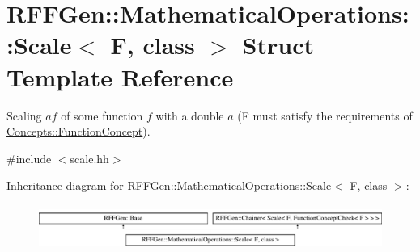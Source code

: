 \hypertarget{structRFFGen_1_1MathematicalOperations_1_1Scale}{\section{R\-F\-F\-Gen\-:\-:Mathematical\-Operations\-:\-:Scale$<$ F, class $>$ Struct Template Reference}
\label{structRFFGen_1_1MathematicalOperations_1_1Scale}
}


Scaling $ af $ of some function $ f $ with a double $ a $ (F must satisfy the requirements of \hyperlink{structRFFGen_1_1Concepts_1_1FunctionConcept}{Concepts\-::\-Function\-Concept}).  




{\ttfamily \#include $<$scale.\-hh$>$}

Inheritance diagram for R\-F\-F\-Gen\-:\-:Mathematical\-Operations\-:\-:Scale$<$ F, class $>$\-:\begin{figure}[H]
\begin{center}
\leavevmode
\includegraphics[height=1.477572cm]{structRFFGen_1_1MathematicalOperations_1_1Scale}
\end{center}
\end{figure}
